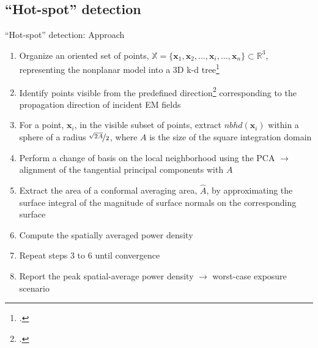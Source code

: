 \documentclass[xcolor=dvipsnames,10pt]{beamer}
\begin{document}
\subsection{``Hot-spot'' detection}
\begin{frame}{``Hot-spot'' detection: Approach}
    \begin{enumerate}
        \item Organize an oriented set of points, $\mathbb{X} = \{ \mathbf{x}_1, \mathbf{x}_2, \dots, \mathbf{x}_i, \dots, \mathbf{x}_n \} \subset \mathbb{R}^3$, representing the nonplanar model into a 3D k-d tree\footcite{Bentley1975Multidimensional}
        \item Identify points visible from the predefined direction\footcite{Katz2007Direct} corresponding to the propagation direction of incident EM fields
        \item For a point, $\mathbf{x}_i$, in the visible subset of points, extract $nbhd \left( \mathbf{x}_i \right)$ within a sphere of a radius $\nicefrac{\sqrt{2 A}}{2}$, where $A$ is the size of the square integration domain
        \item Perform a change of basis on the local neighborhood using the PCA $\rightarrow$ alignment of the tangential principal components with $A$
        \item Extract the area of a conformal averaging area, $\hat{A}$, by approximating the surface integral of the magnitude of surface normals on the corresponding surface
        \item Compute the spatially averaged power density
        \item Repeat steps \num{3} to \num{6} until convergence
        \item Report the peak spatial-average power density $\rightarrow$ worst-case exposure scenario
        \end{enumerate}
\end{frame}
\end{document}
